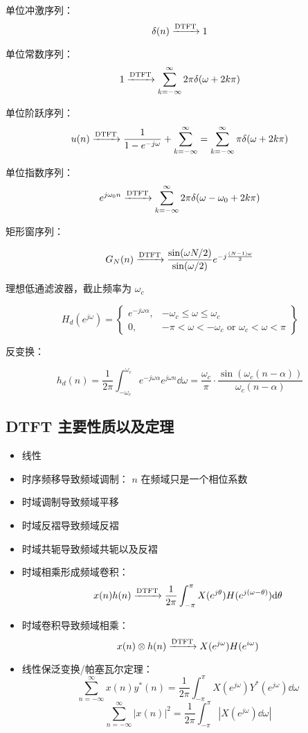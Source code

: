 \documentclass[cn,11pt,chinese,black,simple]{../elegantbook}
\begin{document}
单位冲激序列：
\[\delta(n) \xrightarrow{\text{DTFT}} 1\]

单位常数序列：
\[1 \xrightarrow{\text{DTFT}} \sum_{k=-\infty}^\infty 2 \pi \delta(\omega + 2 k \pi)\]

单位阶跃序列：
\[u(n) \xrightarrow{\text{DTFT}} \frac{1}{1 - e^{-j \omega}} + \sum_{k = -\infty}^\infty = \sum_{k=-\infty}^\infty \pi \delta(\omega + 2 k \pi)\]

单位指数序列：
\[e^{j \omega_0 n} \xrightarrow{\text{DTFT}} \sum_{k=-\infty}^\infty 2 \pi \delta(\omega - \omega_0 + 2 k \pi)\]

矩形窗序列：

\[G_N(n) \xrightarrow{\text{DTFT}} \frac{\sin(\omega N / 2)}{\sin(\omega / 2)}e^{-j \frac{(N-1)\omega}{2}}\]

理想低通滤波器，截止频率为 \(\omega_c\)

\[H_d(e^{j\omega}) = \left\{
\begin{aligned}
    e^{-j\omega \alpha}, & -\omega_c \leq \omega \leq \omega_c \\
    0, &-\pi < \omega < -\omega_c \text{ or } \omega_c < \omega < \pi 
\end{aligned}    
\right\}\]

反变换：

\[
h_d(n) = \frac{1}{2 \pi} \int_{-\omega_c}^{\omega_c}e^{-j\omega \alpha} e^{j\omega n} \dd{\omega} = \frac{\omega_c}{\pi} \cdot \frac{\sin (\omega_c(n-\alpha))}{\omega_c (n-\alpha)}
\]

\subsection{DTFT 主要性质以及定理}

\begin{itemize}
    \item 线性
    \item 时序频移导致频域调制： \(n\) 在频域只是一个相位系数
    \item 时域调制导致频域平移
    \item 时域反褶导致频域反褶
    \item 时域共轭导致频域共轭以及反褶
    \item 时域相乘形成频域卷积：\[x(n)h(n) \xrightarrow{\text{DTFT}} \frac{1}{2 \pi} \int_{-\pi}^\pi X(e^{j\theta})H(e^{j(\omega-\theta)}) \mathrm{d}\theta\]
    \item 时域卷积导致频域相乘：\[x(n) \otimes h(n) \xrightarrow{\text{DTFT}} X(e^{j\omega}) H(e^{i \omega})\]
    \item 线性保泛变换/帕塞瓦尔定理：\[\sum_{n = -\infty}^\infty x(n) y^*(n) = \frac{1}{2\pi} \int_{-\pi}^{\pi} X(e^{j \omega}) Y^*(e^{j\omega}) \dd{\omega}\]
    \[\sum_{n=-\infty}^{\infty} |x(n)|^2 = \frac{1}{2\pi} \int_{-\pi}^{\pi}  |X(e^{j\omega}) \dd{\omega}|\]
\end{itemize}
\end{document}
